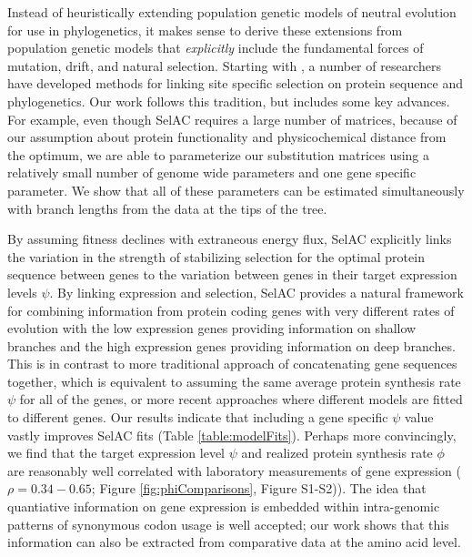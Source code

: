 \documentclass{article}
\newcommand{\selac}{SelAC\xspace}
\begin{document}
Instead of heuristically extending population genetic models of neutral evolution for use in phylogenetics, it makes sense to derive these extensions from population genetic models that \emph{explicitly} include the fundamental forces of mutation, drift, and natural selection. %
Starting with \citet{HalpernAndBruno1998}, a number of researchers have developed methods for linking site specific selection on protein sequence and phylogenetics\citep[e.g.~][]{KoshiEtAl1999,DimmicEtAl2000,KoshiAndGoldstein2001,RobinsonEtAl2003,LartillotAndPhilippe2004,ThorneEtAl2012,RodrigueAndLartillot2014}. %
Our work follows this tradition, but includes some key advances.
For example, even though \selac requires a large number of matrices, because of our assumption about protein functionality and physicochemical distance from the optimum, we are able to parameterize our substitution matrices using a relatively small number of genome wide parameters and one gene specific parameter.
We show that all of these parameters can be estimated simultaneously with branch lengths from the data at the tips of the tree.

By assuming fitness declines with extraneous energy flux, \selac explicitly links the variation in the strength of stabilizing selection for the optimal protein sequence between genes to the variation between genes in their target expression levels $\psi$.
By linking expression and selection, \selac provides a natural framework for combining information from protein coding genes with very different rates of evolution with the low expression genes providing information on shallow branches and the high expression genes providing information on deep branches.
This is in contrast to more traditional approach of concatenating gene sequences together, which is equivalent to assuming the same average protein synthesis rate $\psi$ for all of the genes, or more recent approaches where different models are fitted to different genes.
Our results indicate that including a gene specific $\psi$ value vastly improves \selac fits (Table \ref{table:modelFits}).
Perhaps more convincingly, we find that the target expression level $\psi$ and realized protein synthesis rate $\phi$ are reasonably well correlated with laboratory measurements of gene expression ($\rho = 0.34-0.65$; Figure \ref{fig:phiComparisons}, Figure S1-S2)).
The idea that quantiative information on gene expression is embedded within intra-genomic patterns of synonymous codon usage is well accepted; our work shows that this information can also be extracted from comparative data at the amino acid level.
\end{document}
